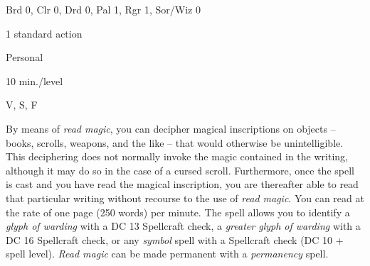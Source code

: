 
\begin{description*}
\item[Level:] Brd 0, Clr 0, Drd 0, Pal 1, Rgr 1, Sor/Wiz 0
\item[Casting Time:] 1 standard action
\item[Range:] Personal
\item[Duration:] 10 min./level
\item[Components:] V, S, F
\end{description*}

By means of \textit{read magic}, you can decipher magical inscriptions on objects -- books,
scrolls, weapons, and the like -- that would otherwise be unintelligible. This deciphering
does not normally invoke the magic contained in the writing, although it may do
so in the case of a cursed scroll. Furthermore, once the spell is cast and you
have read the magical inscription, you are thereafter able to read that particular
writing without recourse to the use of \textit{read magic}. You can read at the
rate of one page (250 words) per minute. The spell allows you to identify a \textit{glyph
of warding} with a DC 13 Spellcraft check, a \textit{greater glyph of warding} with
a DC 16 Spellcraft check, or any \textit{symbol} spell with a Spellcraft check
(DC 10 + spell level).
\textit{Read magic} can be made permanent with a \textit{permanency} spell.